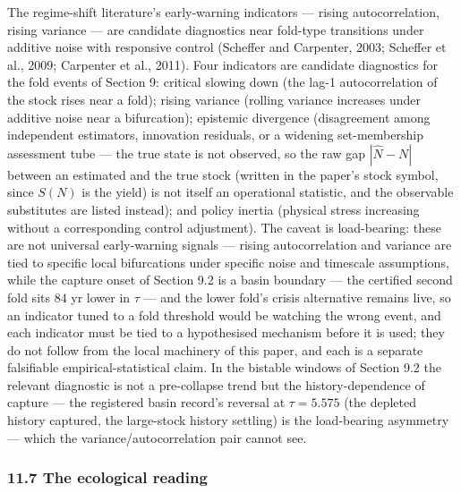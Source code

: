 \documentclass[11pt]{article}
\begin{document}
The regime-shift literature's early-warning indicators --- rising
autocorrelation, rising variance --- are candidate diagnostics near
fold-type transitions under additive noise with responsive control
(Scheffer and Carpenter, 2003; Scheffer et al., 2009; Carpenter et al.,
2011). Four indicators are candidate diagnostics for the fold events of
Section 9: critical slowing down (the lag-1 autocorrelation of the stock
rises near a fold); rising variance (rolling variance increases under
additive noise near a bifurcation); epistemic divergence (disagreement
among independent estimators, innovation residuals, or a widening
set-membership assessment tube --- the true state is not observed, so
the raw gap \(|\hat N - N|\) between an estimated and the true stock
(written in the paper's stock symbol, since \(S(N)\) is the yield) is
not itself an operational statistic, and the observable substitutes are
listed instead); and policy inertia (physical stress increasing without
a corresponding control adjustment). The caveat is load-bearing: these
are not universal early-warning signals --- rising autocorrelation and
variance are tied to specific local bifurcations under specific noise
and timescale assumptions, while the capture onset of Section 9.2 is a
basin boundary --- the certified second fold sits \(84\) yr lower in
\(\tau\) --- and the lower fold's crisis alternative remains live, so an
indicator tuned to a fold threshold would be watching the wrong event,
and each indicator must be tied to a hypothesised mechanism before it is
used; they do not follow from the local machinery of this paper, and
each is a separate falsifiable empirical-statistical claim. In the
bistable windows of Section 9.2 the relevant diagnostic is not a
pre-collapse trend but the history-dependence of capture --- the
registered basin record's reversal at \(\tau = 5.575\) (the depleted
history captured, the large-stock history settling) is the load-bearing
asymmetry --- which the variance/autocorrelation pair cannot see.

\subsubsection{11.7 The ecological
reading}\label{the-ecological-reading}
\end{document}
